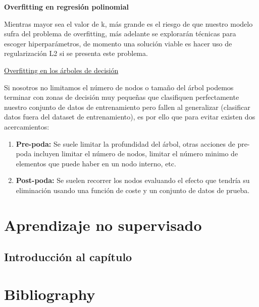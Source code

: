 \documentclass[11pt,fleqn]{book} %
\begin{document}
\textbf{Overfitting en regresión polinomial}

Mientras mayor sea el valor de k, más grande es el riesgo de que nuestro modelo sufra del problema de overfitting, más adelante se explorarán técnicas para escoger hiperparámetros, de momento una solución viable es hacer uso de regularización L2 si se presenta este problema.


\underline{Overfitting en los árboles de decisión}

Si nosotros no limitamos el número de nodos o tamaño del árbol podemos terminar con zonas de decisión muy pequeñas que clasifiquen perfectamente nuestro conjunto de datos de entrenamiento pero fallen al generalizar (clasificar datos fuera del dataset de entrenamiento), es por ello que para evitar existen dos acercamientos:

\begin{enumerate}
\item \textbf{Pre-poda:} Se suele limitar la profundidad del árbol, otras acciones de pre-poda incluyen limitar el número de nodos, limitar el número minimo de elementos que puede haber en un nodo interno, etc.
\item \textbf{Post-poda:} Se suelen recorrer los nodos evaluando el efecto que tendría su eliminación usando una función de coste y un conjunto de datos de prueba.

\end{enumerate}




\chapter{Aprendizaje no supervisado}

\section{Introducción al capítulo} 

\chapter*{Bibliography}
\end{document}
